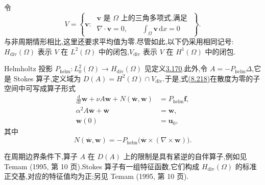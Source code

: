 \begin{note}[分析的函数空间设置]
\label{note:navier-stokes-alpha-analysis-setup}
令
\[
 V=\left\{\bm{v}:\ \begin{array}{l}
 \bm{v}\text{ 是 }\Omega\text{ 上的三角多项式,满足 }\\[-2pt]
 \nabla\cdot\bm{v}=0,\qquad
 \displaystyle\int_\Omega\bm{v}\,\mathrm{d}x=0
 \end{array}\right\}.
\]
与非周期情形相比,这里还要求平均值为零.尽管如此,以下仍采用相同记号:$H_{\mathrm{div}}(\Omega)$ 表示 $V$ 在 $L^2(\Omega)$ 中的闭包,$V_{\mathrm{div}}$ 表示 $V$ 在 $H^1(\Omega)$ 中的闭包.

Helmholtz 投影 $P_{\mathrm{helm}}:L_0^2(\Omega)\to H_{\mathrm{div}}(\Omega)$ 见定义\hyperref[def:helmholtz-projection]{3.170}.此外,令 $A=-P_{\mathrm{helm}}\Delta$,它是 Stokes 算子,定义域为 $D(A)=H^2(\Omega)\cap V_{\mathrm{div}}$.于是,式\hyperref[eq:navier-stokes-alpha-periodic-model]{(8.218)}在散度为零的子空间中可写成算子形式
\begin{equation}\label{eq:navier-stokes-alpha-operator-form}
\begin{aligned}
 \frac{\mathrm{d}}{\mathrm{d}t}\bm{w}
   +\nu A\bm{w}+N(\overline{\bm{w}},\bm{w})
   &=P_{\mathrm{helm}}\bm{f},\\
 \alpha^2A\overline{\bm{w}}+\overline{\bm{w}}
   &=\bm{w},\\
 \bm{w}(0)&=\bm{u}_0,
\end{aligned}
\end{equation}
其中
\[
 N(\overline{\bm{w}},\bm{w})
 =-P_{\mathrm{helm}}\bigl(\overline{\bm{w}}\times
                  (\nabla\times\bm{w})\bigr).
\]
\end{note}

\begin{note}[Stokes 算子]
\label{note:navier-stokes-alpha-stokes-operator}
在周期边界条件下,算子 $A$ 在 $D(A)$ 上的限制是具有紧逆的自伴算子,例如见 Temam (1995, 第 10 页).Stokes 算子有一组特征函数,它们构成 $H_{\mathrm{div}}(\Omega)$ 的标准正交基,对应的特征值均为正;另见 Temam (1995, 第 10 页).
\end{note}

